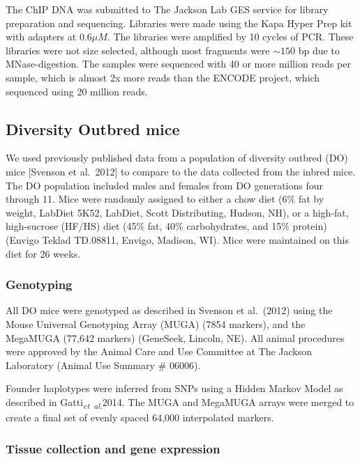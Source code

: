 \documentclass[10pt,letterpaper]{article}
\begin{document}
The ChIP DNA was submitted to The Jackson Lab GES service for library
preparation and sequencing. Libraries were made using the Kapa Hyper
Prep kit with adapters at \(0.6\mu M\). The libraries were amplified by
10 cycles of PCR. These libraries were not size selected, although most
fragments were \(\sim150\) bp due to MNase-digestion. The samples were
sequenced with 40 or more million reads per sample, which is almost 2x
more reads than the ENCODE project, which sequenced using 20 million
reads.

\hypertarget{diversity-outbred-mice}{%
\subsection{Diversity Outbred mice}\label{diversity-outbred-mice}}

We used previously published data from a population of diversity outbred
(DO) mice {[}Svenson et al.~2012{]} to compare to the data collected
from the inbred mice. The DO population included males and females from
DO generations four through 11. Mice were randomly assigned to either a
chow diet (6\% fat by weight, LabDiet 5K52, LabDiet, Scott Distributing,
Hudson, NH), or a high-fat, high-sucrose (HF/HS) diet (45\% fat, 40\%
carbohydrates, and 15\% protein) (Envigo Teklad TD.08811, Envigo,
Madison, WI). Mice were maintained on this diet for 26 weeks.

\hypertarget{genotyping}{%
\subsubsection{Genotyping}\label{genotyping}}

All DO mice were genotyped as described in Svenson et al.~(2012) using
the Mouse Universal Genotyping Array (MUGA) (7854 markers), and the
MegaMUGA (77,642 markers) (GeneSeek, Lincoln, NE). All animal procedures
were approved by the Animal Care and Use Committee at The Jackson
Laboratory (Animal Use Summary \# 06006).

Founder haplotypes were inferred from SNPs using a Hidden Markov Model
as described in Gatti\textsubscript{\textit{et~al.}}2014. The MUGA and
MegaMUGA arrays were merged to create a final set of evenly spaced
64,000 interpolated markers.

\hypertarget{tissue-collection-and-gene-expression}{%
\subsubsection{Tissue collection and gene
expression}\label{tissue-collection-and-gene-expression}}
\end{document}
